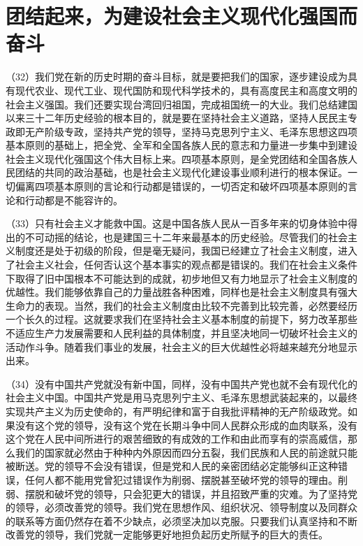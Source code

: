 \section{团结起来，为建设社会主义现代化强国而奋斗}

（32）我们党在新的历史时期的奋斗目标，就是要把我们的国家，逐步建设成为具有现代农业、现代工业、现代国防和现代科学技术的，具有高度民主和高度文明的社会主义强国。我们还要实现台湾回归祖国，完成祖国统一的大业。我们总结建国以来三十二年历史经验的根本目的，就是要在坚持社会主义道路，坚持人民民主专政即无产阶级专政，坚持共产党的领导，坚持马克思列宁主义、毛泽东思想这四项基本原则的基础上，把全党、全军和全国各族人民的意志和力量进一步集中到建设社会主义现代化强国这个伟大目标上来。四项基本原则，是全党团结和全国各族人民团结的共同的政治基础，也是社会主义现代化建设事业顺利进行的根本保证。一切偏离四项基本原则的言论和行动都是错误的，一切否定和破坏四项基本原则的言论和行动都是不能容许的。

（33）只有社会主义才能救中国。这是中国各族人民从一百多年来的切身体验中得出的不可动摇的结论，也是建国三十二年来最基本的历史经验。尽管我们的社会主义制度还是处于初级的阶段，但是毫无疑问，我国已经建立了社会主义制度，进入了社会主义社会，任何否认这个基本事实的观点都是错误的。我们在社会主义条件下取得了旧中国根本不可能达到的成就，初步地但又有力地显示了社会主义制度的优越性。我们能够依靠自己的力量战胜各种困难，同样也是社会主义制度具有强大生命力的表现。当然，我们的社会主义制度由比较不完善到比较完善，必然要经历一个长久的过程。这就要求我们在坚持社会主义基本制度的前提下，努力改革那些不适应生产力发展需要和人民利益的具体制度，并且坚决地同一切破坏社会主义的活动作斗争。随着我们事业的发展，社会主义的巨大优越性必将越来越充分地显示出来。

（34）没有中国共产党就没有新中国，同样，没有中国共产党也就不会有现代化的社会主义中国。中国共产党是用马克思列宁主义、毛泽东思想武装起来的，以最终实现共产主义为历史使命的，有严明纪律和富于自我批评精神的无产阶级政党。如果没有这个党的领导，没有这个党在长期斗争中同人民群众形成的血肉联系，没有这个党在人民中间所进行的艰苦细致的有成效的工作和由此而享有的崇高威信，那么我们的国家就必然由于种种内外原因而四分五裂，我们民族和人民的前途就只能被断送。党的领导不会没有错误，但是党和人民的亲密团结必定能够纠正这种错误，任何人都不能用党曾犯过错误作为削弱、摆脱甚至破坏党的领导的理由。削弱、摆脱和破坏党的领导，只会犯更大的错误，并且招致严重的灾难。为了坚持党的领导，必须改善党的领导。我们党在思想作风、组织状况、领导制度以及同群众的联系等方面仍然存在着不少缺点，必须坚决加以克服。只要我们认真坚持和不断改善党的领导，我们党就一定能够更好地担负起历史所赋予的巨大的责任。

